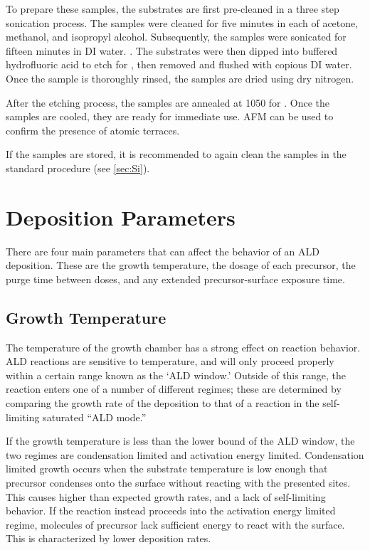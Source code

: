 To prepare these samples, the substrates are first pre-cleaned in a three step sonication process. The samples were cleaned for five minutes in each of acetone, methanol, and isopropyl alcohol. Subsequently, the samples were sonicated for fifteen minutes in DI water. . The substrates were then dipped into buffered hydrofluoric acid to etch for , then removed and flushed with copious DI water.  Once the sample is thoroughly rinsed, the samples are dried using dry nitrogen. 

After the etching process, the samples are annealed at 1050\degC{} for . Once the samples are cooled, they are ready for immediate use. AFM can be used to confirm the presence of atomic terraces. 

If the samples are stored, it is recommended to again clean the samples in the standard procedure (see \vref{sec:Si}).


\section{Deposition Parameters}
\label{sec:SampFab-DepParams}

There are four main parameters that can affect the behavior of an ALD deposition.  These are the growth temperature, the dosage of each precursor, the purge time between doses, and any extended precursor-surface exposure time. 


\subsection{Growth Temperature}

The temperature of the growth chamber has a strong effect on reaction behavior. ALD reactions are sensitive to temperature, and will only proceed properly within a certain range known as the `ALD window.' Outside of this range, the reaction enters one of a number of different regimes; these are determined by comparing the growth rate of the deposition to that of a reaction in the self-limiting saturated ``ALD mode.'' 

If the growth temperature is less than the lower bound of the ALD window, the two regimes are condensation limited and activation energy limited. Condensation limited growth occurs when the substrate temperature is low enough that precursor condenses onto the surface without reacting with the presented sites. This causes higher than expected growth rates, and a lack of self-limiting behavior. If the reaction instead proceeds into the activation energy limited regime, molecules of precursor lack sufficient energy to react with the surface. This is characterized by lower deposition rates. 

